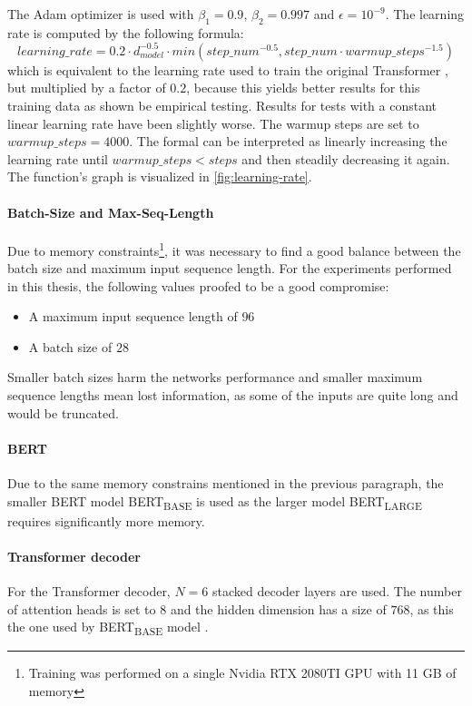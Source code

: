 The Adam optimizer \cite{article} is used with $\beta_1=0.9$, $\beta_2=0.997$ and $\epsilon = 10^{-9}$.
The learning rate is computed by the following formula:
\[
	learning\_rate = 0.2 \cdot d_{model}^{-0.5} \cdot min(step\_num^{-0.5}, step\_num \cdot warmup\_steps^{-1.5})
\]
which is equivalent to the learning rate used to train the original Transformer \cite[p.~7]{1706.03762}, but multiplied by a factor of $0.2$, because this yields better results for this training data as shown be empirical testing.
Results for tests with a constant linear learning rate have been slightly worse.
The warmup steps are set to $warmup\_steps = 4000$.
The formal can be interpreted as linearly increasing the learning rate until $warmup\_steps < steps$ and then steadily decreasing it again.
The function's graph is visualized in \cref{fig:learning-rate}.

\paragraph{Batch-Size and Max-Seq-Length}

Due to memory constraints\footnote{Training was performed on a single Nvidia RTX 2080TI GPU with 11 GB of memory}, it was necessary to find a good balance between the batch size and maximum input sequence length.
For the experiments performed in this thesis, the following values proofed to be a good compromise:
\begin{itemize}
\item A maximum input sequence length of $96$ %
\item A batch size of $28$
\end{itemize}

Smaller batch sizes harm the networks performance and smaller maximum sequence lengths mean lost information, as some of the inputs are quite long and would be truncated.

\paragraph{BERT}

Due to the same memory constrains mentioned in the previous paragraph, the smaller BERT model BERT\textsubscript{BASE} is used as the larger model BERT\textsubscript{LARGE} requires significantly more memory.

\paragraph{Transformer decoder}

For the Transformer decoder, $N=6$ stacked decoder layers are used.
The number of attention heads is set to $8$ and the hidden dimension has a size of $768$, as this the one used by BERT\textsubscript{BASE} model \cite[p.~3]{devlin2018bert}.